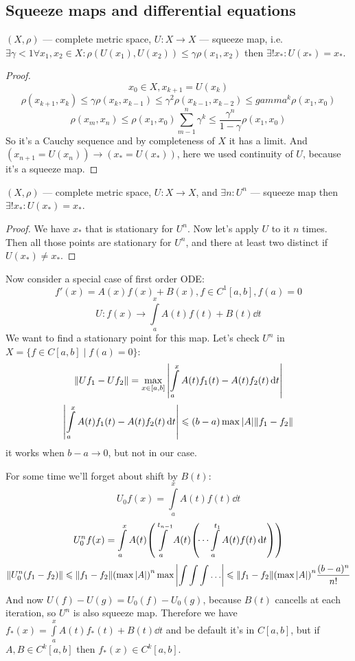 \subsection*{Squeeze maps and differential equations}

\begin{thr}
    $(X, \rho)$ --- complete metric space, $U: X \to X$ --- squeeze map, i.e.
    $\exists \gamma < 1 \forall x_1, x_2 \in X: \rho(U(x_1), U(x_2)) \le \gamma \rho(x_1, x_2)$ then 
    $\exists! x_*: U(x_*) = x_*$.
\end{thr}
\begin{proof}
    \[ x_0 \in X, x_{k+1} = U(x_k) \] 
    \[ \rho(x_{k+1}, x_k) \le \gamma \rho(x_{k}, x_{k-1}) \le \gamma^2 \rho(x_{k-1}, x_{k-2}) \le gamma^k \rho(x_1, x_0) \] 
    \[ \rho(x_m, x_n) \le \rho(x_1, x_0) \sum_{m-1}^{n} \gamma^k \le \frac{\gamma^n}{1-\gamma} \rho(x_1, x_0) \] 
    So it's a Cauchy sequence and by completeness of $X$ it has a limit.
    And $(x_{n+1} = U(x_n)) \to (x_* = U(x_*))$, here we used continuity of $U$, because it's a squeeze map.
\end{proof}

\begin{thr}
    $(X, \rho)$ --- complete metric space, $U: X \to X$, and $\exists n: U^n$ --- squeeze map then  $\exists! x_*: U(x_*) = x_*$.
\end{thr}
\begin{proof} 
    We have $x_*$ that is stationary for $U^n$. Now let's apply $U$ to it $n$ times. Then all those points are stationary for $U^n$,
    and there at least two distinct if $U(x_*) \ne x_*$.
\end{proof}

Now consider a special case of first order ODE: 
\[ f'(x) = A(x)f(x) + B(x), f \in C^1[a, b], f(a) = 0 \] 
\[ U: f(x) \to \int\limits_a^x A(t)f(t) + B(t) \dd{t} \] 
We want to find a stationary point for this map. Let's check $U^n$ in $X = \{ f \in C[a, b] \mid f(a) = 0 \}$:
\[ \norm{ Uf_1 - Uf_2 } = \max\limits_{x \in [a, b]} \qty| \int\limits_a^x A(t)f_1(t) - A(t)f_2(t) \dd{t} | \]
\[ \qty| \int\limits_a^x A(t)f_1(t) - A(t)f_2(t) \dd{t} | \leqslant (b - a)\max |A| \norm{f_1 - f_2} \] 
it works when $b - a \to 0$, but not in our case.

For some time we'll forget about shift by $B(t)$:
\[ U_0 f(x) = \int\limits_a^x A(t)f(t) \dd{t} \]
\[ U_0^n f(x) = \int\limits_a^{x} A(t) \qty( \int\limits_a^{t_{n-1}} A(t) \qty( \dots \int\limits_a^{t_1} A(t) f(t) \dd{t} )) \] 
\[ \norm{U_0^n (f_1 - f_2)} \leqslant \norm{f_1 - f_2} \qty(\max |A|)^n \max \qty|\int \int \int \dots| \leqslant \norm{f_1 - f_2} \qty(\max |A|)^n \frac{(b-a)^n}{n!} \]
And now $U(f) - U(g) = U_0(f) - U_0(g)$, because $B(t)$ cancells at each iteration, so $U^n$ is also squeeze map. 
Therefore we have $f_*(x) = \int\limits_a^x A(t)f_*(t) + B(t)\dd{t}$ and be default it's in $C[a,b]$, but if $A, B \in C^k[a, b]$ then $f_*(x) \in C^k[a,b]$.


